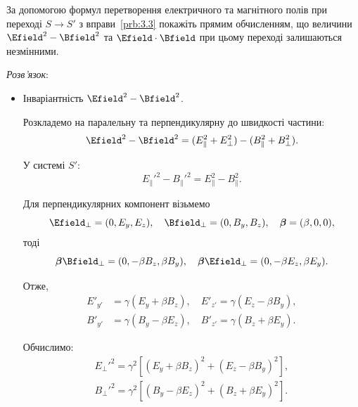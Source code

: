 \begin{problem}
За допомогою формул перетворення електричного та магнітного полів при переході $S\to S'$ з вправи~\ref{prb:3.3} покажіть прямим обчисленням, що величини $\Efield^{2}-\Bfield^{2}$ та $\Efield\cdot\Bfield$ при цьому переході залишаються незмінними.

\vspace{1ex}
\textit{Розв'язок}:
\begin{itemize}
\item Інваріантність $\Efield^2 - \Bfield^2$.

Розкладемо на паралельну та перпендикулярну до швидкості частини:
\begin{equation*}
    \Efield^2 - \Bfield^2 = (E_\parallel^2 + E_\perp^2) - (B_\parallel^2 + B_\perp^2).
\end{equation*}

У системі $S'$:
\begin{equation*}
    E_\parallel'^2 - B_\parallel'^2 = E_\parallel^2 - B_\parallel^2.
\end{equation*}

Для перпендикулярних компонент візьмемо
\begin{equation*}
    \Efield_\perp = (0, E_y, E_z), \quad \Bfield_\perp = (0, B_y, B_z), \quad \boldsymbol{\beta} = (\beta, 0, 0),
\end{equation*}
тоді
\begin{equation*}
    \boldsymbol{\beta} \Bfield_\perp = (0, -\beta B_z, \beta B_y), \quad
    \boldsymbol{\beta} \Efield_\perp = (0, -\beta E_z, \beta E_y).
\end{equation*}

Отже,
\begin{equation*}
    \begin{aligned}
    E'_{y'} &= \gamma (E_y + \beta B_z), \quad E'_{z'} = \gamma (E_z - \beta B_y), \\
    B'_{y'} &= \gamma (B_y - \beta E_z), \quad B'_{z'} = \gamma (B_z + \beta E_y).
    \end{aligned}
\end{equation*}

Обчислимо:
\begin{align*}
    E_\perp'^2 = \gamma^2 \left[ (E_y + \beta B_z)^2 + (E_z - \beta B_y)^2 \right], \\
    B_\perp'^2 = \gamma^2 \left[ (B_y - \beta E_z)^2 + (B_z + \beta E_y)^2 \right].
\end{align*}


\end{itemize}
\end{problem}

